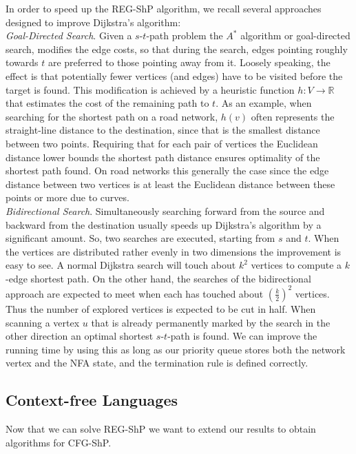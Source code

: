 \documentclass[]{article}
\numberwithin{equation}{section}
\begin{document}
In order to speed up the REG-ShP algorithm, we recall several approaches designed to improve Dijkstra’s algorithm:\\

\noindent \textit{Goal-Directed Search}. Given a $s$-$t$-path problem the $A^*$ algorithm or goal-directed search, modifies the edge costs, so that during the search, edges pointing roughly towards $t$ are preferred to those pointing away from it. Loosely speaking, the effect is that potentially fewer vertices (and edges) have to be visited before the target is found. This modification is achieved by a heuristic function $h:V\rightarrow\mathbb{R}$ that estimates the cost of the remaining path to $t$. As an example, when searching for the shortest path on a road network, $h(v)$ often represents the straight-line distance to the destination, since that is the smallest distance between two points. Requiring that for each pair of vertices the Euclidean distance lower bounds the shortest path distance ensures optimality of the shortest path found. On road networks this generally the case since the edge distance between two vertices is at least the Euclidean distance between these points or more due to curves.\\

\noindent \textit{Bidirectional Search}. Simultaneously searching forward from the source and backward from the destination usually speeds up Dijkstra's algorithm by a significant amount. So, two searches are executed, starting from $s$ and $t$. When the vertices are distributed rather evenly in two dimensions the improvement is easy to see. A normal Dijkstra search will touch about $k^2$ vertices to compute a $k$-edge shortest path. On the other hand, the searches of the bidirectional approach are expected to meet when each has touched about $(\frac{k}{2})^2$ vertices. Thus the number of explored vertices is expected to be cut in half. When scanning a vertex $u$ that is already permanently marked by the search in the other direction an optimal shortest $s$-$t$-path is found. We can improve the running time by using this as long as our priority queue stores both the network vertex and the NFA state, and the termination rule is defined correctly.

\subsection{Context-free Languages}
\label{sec:shp:cfg}

Now that we can solve REG-ShP we want to extend our results to obtain algorithms for CFG-ShP.\\
\end{document}

